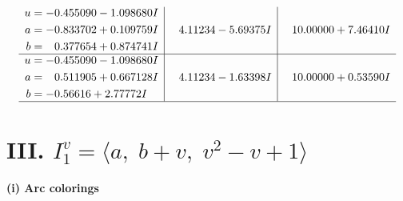\documentclass[1p]{elsarticle_modified}
\theoremstyle{definition}
\begin{document}
$$\begin{array}{c|c|c}
\begin{aligned}
u &= -0.455090 - 1.098680 I \\
a &= -0.833702 + 0.109759 I \\
b &= \phantom{-}0.377654 + 0.874741 I\end{aligned}
 & \phantom{-}4.11234 - 5.69375 I & \phantom{-}10.00000 + 7.46410 I \\ \hline\begin{aligned}
u &= -0.455090 - 1.098680 I \\
a &= \phantom{-}0.511905 + 0.667128 I \\
b &= -0.56616 + 2.77772 I\end{aligned}
 & \phantom{-}4.11234 - 1.63398 I & \phantom{-}10.00000 + 0.53590 I\\
 \hline 
 \end{array}$$\newpage\newpage\renewcommand{\arraystretch}{1}
\centering \section*{III. $I^v_{1}= \langle a,\;b+v,\;v^2- v+1 \rangle$}
\flushleft \textbf{(i) Arc colorings}\\
\end{document}
